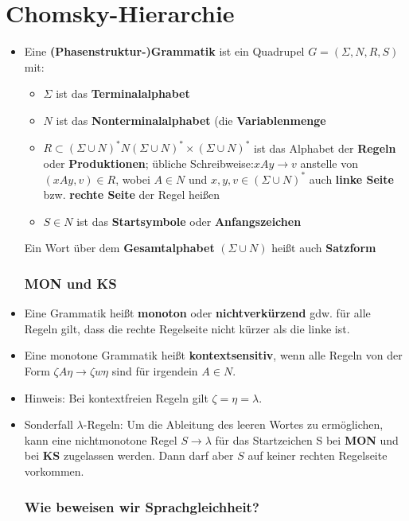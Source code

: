 \documentclass[12pt, a4paper]{article}
\begin{document}
	\section{Chomsky-Hierarchie}
	\begin{itemize}
		\item Eine \textbf{(Phasenstruktur-)Grammatik} ist ein Quadrupel $G=(\Sigma,N,R,S)$ mit:
		\begin{itemize}
			\item $\Sigma$ ist das \textbf{Terminalalphabet}
			\item $N$ ist das \textbf{Nonterminalalphabet} (die \textbf{Variablenmenge}
			\item $R\subset (\Sigma\cup N)^{*}N(\Sigma\cup N)^{*}\times(\Sigma\cup N)^{*}$ ist das Alphabet der \textbf{Regeln} oder \textbf{Produktionen}; übliche Schreibweise:$xAy\rightarrow v$ anstelle von $(xAy,v)\in R$, wobei $A\in N$ und $x,y,v\in(\Sigma\cup N)^{*}$ auch \textbf{linke Seite} bzw. \textbf{rechte Seite} der Regel heißen
			\item $S\in N$ ist das \textbf{Startsymbole} oder \textbf{Anfangszeichen}
		\end{itemize}
		\subitem Ein Wort über dem \textbf{Gesamtalphabet} $(\Sigma\cup N)$ heißt auch \textbf{Satzform}
		
		\subsubsection{\textbf{MON} und \textbf{KS}}
			\item Eine Grammatik heißt \textbf{monoton} oder \textbf{nichtverkürzend} gdw. für alle Regeln gilt, dass die rechte Regelseite nicht kürzer als die linke ist.
			
			\item Eine monotone Grammatik heißt \textbf{kontextsensitiv}, wenn alle Regeln von der Form $\zeta A\eta\rightarrow\zeta w\eta$ sind für irgendein $A\in N$.
			
			\item {\small Hinweis: Bei kontextfreien Regeln gilt $\zeta=\eta=\lambda$.}
			
			\item Sonderfall $\lambda$-Regeln: Um die Ableitung des leeren Wortes zu ermöglichen, kann eine nichtmonotone Regel $S\rightarrow\lambda$ für das Startzeichen S bei \textbf{MON} und bei \textbf{KS} zugelassen werden. Dann darf aber $S$ auf keiner rechten Regelseite vorkommen.
			
		\subsubsection{Wie beweisen wir Sprachgleichheit?}
		

\end{itemize}
\end{document}
